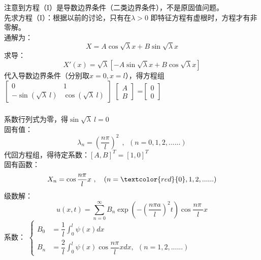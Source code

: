 \begin{frame}
	\frametitle{}
	注意到方程（I）是导数边界条件（二类边界条件），不是原固值问题。\\
	先求方程（I）：根据以前的讨论，只有在$\lambda >0 $ 即特征方程有虚根时，方程才有非零解。\\
	通解为：
	\begin{equation*}
		X=A\cos \sqrt{\lambda} x + B \sin \sqrt{\lambda} x
	\end{equation*}
	求导：
	\begin{equation*}
		X' (x)=\sqrt{\lambda} [-A\sin \sqrt{\lambda} x + B \cos \sqrt{\lambda} x]
	\end{equation*}
	代入导数边界条件（分别取$x=0, x=l$），得方程组 \\
	$\left[
	\begin{array}{lll}
		0&1\\
		-\sin( {\sqrt{\lambda}~l}) &\cos ({\sqrt{\lambda}~l})
	\end{array}
	\right]$
	$\left[
	\begin{array}{ll}
		A\\
		B
	\end{array}
	\right]$
	=$\left[
	\begin{array}{ll}
		0\\
		0
	\end{array}
	\right]$\\ 	
\end{frame}	

\begin{frame}
	\frametitle{}
	系数行列式为零，得$ \sin\sqrt{\lambda}~l =0$\\
	固有值：
	\begin{equation*}
		\lambda_n =(\frac{n\pi}{l})^2 ~~,~~ (n=0,1,2,......)
	\end{equation*}
	代回方程组，得待定系数：$ [A, B] ^T =[1, 0] ^T$\\
	固有函数：
	\begin{equation*}
		X_n=\cos \frac{n\pi}{l} x~,~~~  (n=\textcolor{red}{0},1,2,......)
	\end{equation*}
	级数解：
	\begin{equation*}
		u(x,t)=\sum\limits_{n=0}^{\infty } B_n  \exp(-(\frac{n\pi a}{l})^2 t) \cos \frac{n\pi~}{l} x
	\end{equation*}
	系数：
	$\displaystyle  \begin{cases}
		B_0&= \dfrac{1}{l} \int_{0}^{l} \psi(x) dx \\
		B_n&= \dfrac{2}{l} \int_{0}^{l} \psi(x) \cos \dfrac{n\pi}{l} xdx ,~~ (n=1,2,......)
	\end{cases}$ \\	
\end{frame}	

